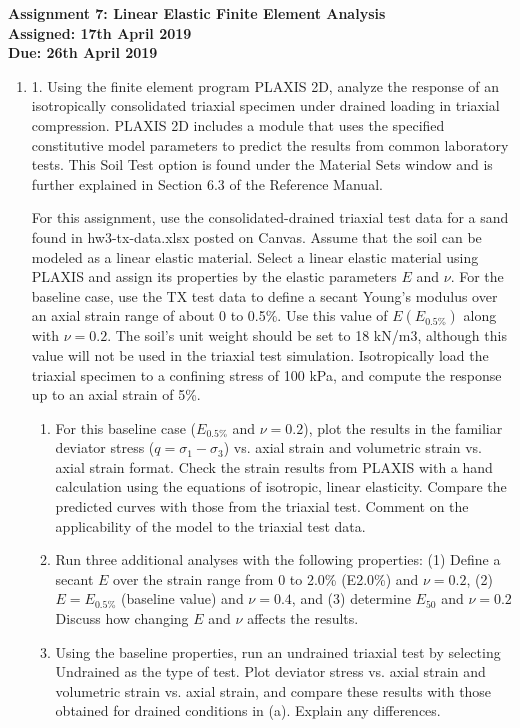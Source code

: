\documentclass[a4paper,12pt]{article}
\begin{document}
\begin{centering}
	\textbf{
		Assignment 7: Linear Elastic Finite Element Analysis\\
		Assigned: 17th April 2019\\
		Due: 26th April 2019\\
	}
\end{centering}

\vspace{1em}
 
\begin{enumerate}

	\item     1. Using the finite element program PLAXIS 2D, analyze the response of an isotropically consolidated triaxial specimen under drained loading in triaxial compression.  PLAXIS 2D includes a module that uses the specified constitutive model parameters to predict the results from common laboratory tests.  This Soil Test option is found under the Material Sets window and is further explained in Section 6.3 of the Reference Manual.  
	
	For this assignment, use the consolidated-drained triaxial test data for a sand found in hw3-tx-data.xlsx posted on Canvas.  Assume that the soil can be modeled as a linear elastic material.  Select a linear elastic material using PLAXIS and assign its properties by the elastic parameters $E$ and $\nu$.  For the baseline case, use the TX test data to define a secant Young's modulus over an axial strain range of about 0 to 0.5\%.  Use this value of $E (E_{0.5\%})$ along with $\nu = 0.2$.  The soil's unit weight should be set to 18 kN/m3, although this value will not be used in the triaxial test simulation.  Isotropically load the triaxial specimen to a confining stress of 100 kPa, and compute the response up to an axial strain of 5\%.  
	
	\begin{enumerate}
		\item For this baseline case ($E_{0.5\%}$ and $\nu = 0.2$), plot the results in the familiar deviator stress ($q = \sigma_1 - \sigma_3$) vs. axial strain and volumetric strain vs. axial strain format.  Check the strain results from PLAXIS with a hand calculation using the equations of isotropic, linear elasticity.  Compare the predicted curves with those from the triaxial test.  Comment on the applicability of the model to the triaxial test data.
		\item Run three additional analyses with the following properties: (1) Define a secant $E$ over the strain range from 0 to 2.0\% (E2.0\%) and $\nu = 0.2$, (2) $E = E_{0.5\%}$ (baseline value) and $\nu = 0.4$, and (3) determine $E_{50}$ and $\nu = 0.2$  Discuss how changing $E$ and $\nu$ affects the results.
		\item Using the baseline properties, run an undrained triaxial test by selecting Undrained as the type of test.  Plot deviator stress vs. axial strain and volumetric strain vs. axial strain, and compare these results with those obtained for drained conditions in (a).  Explain any differences.
	\end{enumerate}
	

\end{enumerate}
\end{document}
